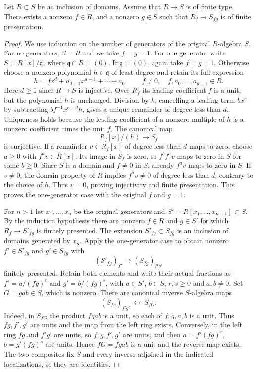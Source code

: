 \begin{lemma}
\label{editorial-source-lemma-generic-finite-presentation}
Let $R \subset S$ be an inclusion of domains.
Assume that $R \to S$ is of finite type.
There exists a nonzero $f \in R$, and a nonzero $g \in S$
such that $R_f \to S_{fg}$ is of finite presentation.
\end{lemma}

\begin{proof}
We use induction on the number of generators of the original
$R$-algebra $S$. For no generators, $S=R$ and we take $f=g=1$.
For one generator write $S=R[x]/\mathfrak q$, where
$\mathfrak q\cap R=(0)$. If $\mathfrak q=(0)$, again take $f=g=1$.
Otherwise choose a nonzero polynomial $h\in\mathfrak q$ of least
degree and retain its full expression
$$
h=f x^d+a_{d-1}x^{d-1}+\cdots+a_0,
\qquad f\ne0,\quad f,a_0,\ldots,a_{d-1}\in R.
$$
Here $d\geq1$ since $R\to S$ is injective. Over $R_f$ its leading
coefficient $f$ is a unit, but the polynomial $h$ is unchanged.
Division by $h$, cancelling a leading term $b x^e$ by subtracting
$bf^{-1}x^{e-d}h$, gives a unique remainder of degree less than $d$.
Uniqueness holds because the leading coefficient of a nonzero
multiple of $h$ is a nonzero coefficient times the unit $f$.
The canonical map
$$
R_f[x]/(h)\longrightarrow S_f
$$
is surjective. If a remainder $v\in R_f[x]$ of degree less than $d$
maps to zero, choose $a\geq0$ with $f^av\in R[x]$.
Its image in $S_f$ is zero, so $f^b f^av$ maps to zero in $S$ for
some $b\geq0$. Since $S$ is a domain and $f\ne0$ in $S$, already
$f^av$ maps to zero in $S$. If $v\ne0$, the domain property of $R$
implies $f^av\ne0$ of degree less than $d$, contrary to the choice
of $h$. Thus $v=0$, proving injectivity and finite presentation.
This proves the one-generator case with the original $f$ and $g=1$.

\medskip\noindent
For $n>1$ let $x_1,\ldots,x_n$ be the original generators and
$S'=R[x_1,\ldots,x_{n-1}]\subset S$. By the induction hypothesis
there are nonzero $f\in R$ and $g\in S'$ for which
$R_f\to S'_{fg}$ is finitely presented. The extension
$S'_{fg}\subset S_{fg}$ is an inclusion of domains generated by
$x_n$. Apply the one-generator case to obtain nonzero
$f'\in S'_{fg}$ and $g'\in S_{fg}$ with
$$
(S'_{fg})_{f'}\longrightarrow (S_{fg})_{f'g'}
$$
finitely presented. Retain both elements and write their actual
fractions as $f'=a/(fg)^r$ and $g'=b/(fg)^s$, with
$a\in S'$, $b\in S$, $r,s\geq0$ and $a,b\ne0$.
Set $G=gab\in S$, which is nonzero. There are canonical inverse
$S$-algebra maps
$$
(S_{fg})_{f'g'}\ \longleftrightarrow\ S_{fG}.
$$
Indeed, in $S_{fG}$ the product $fgab$ is a unit, so each of
$f,g,a,b$ is a unit. Thus $fg,f',g'$ are units and the map from
the left ring exists. Conversely, in the left ring $fg$ and $f'g'$
are units, so $f,g,f',g'$ are units, and then
$a=f'(fg)^r$, $b=g'(fg)^s$ are units. Hence $fG=fgab$ is a unit
and the reverse map exists. The two composites fix $S$ and every
inverse adjoined in the indicated localizations, so they are identities.


\end{proof}
